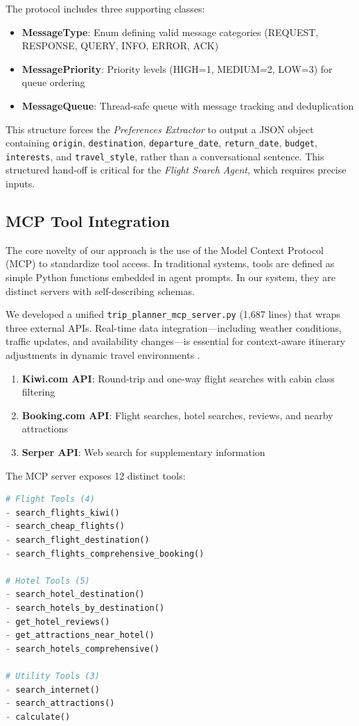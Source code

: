 \documentclass[10pt,twocolumn]{article}
\begin{document}
The protocol includes three supporting classes:
\begin{itemize}
    \item \textbf{MessageType}: Enum defining valid message categories (REQUEST, RESPONSE, QUERY, INFO, ERROR, ACK)
    \item \textbf{MessagePriority}: Priority levels (HIGH=1, MEDIUM=2, LOW=3) for queue ordering
    \item \textbf{MessageQueue}: Thread-safe queue with message tracking and deduplication
\end{itemize}

This structure forces the \textit{Preferences Extractor} to output a JSON object containing \texttt{origin}, \texttt{destination}, \texttt{departure\_date}, \texttt{return\_date}, \texttt{budget}, \texttt{interests}, and \texttt{travel\_style}, rather than a conversational sentence. This structured hand-off is critical for the \textit{Flight Search Agent}, which requires precise inputs.

\subsection{MCP Tool Integration}
The core novelty of our approach is the use of the Model Context Protocol (MCP) to standardize tool access. In traditional systems, tools are defined as simple Python functions embedded in agent prompts. In our system, they are distinct servers with self-describing schemas.

We developed a unified \texttt{trip\_planner\_mcp\_server.py} (1,687 lines) that wraps three external APIs. Real-time data integration---including weather conditions, traffic updates, and availability changes---is essential for context-aware itinerary adjustments in dynamic travel environments \cite{anitha2025intelligent, ravindra2025seamless}.

\begin{enumerate}
    \item \textbf{Kiwi.com API}: Round-trip and one-way flight searches with cabin class filtering
    \item \textbf{Booking.com API}: Flight searches, hotel searches, reviews, and nearby attractions
    \item \textbf{Serper API}: Web search for supplementary information
\end{enumerate}

The MCP server exposes 12 distinct tools:

\begin{lstlisting}[language=Python, caption=MCP Tool Categories]
# Flight Tools (4)
- search_flights_kiwi()
- search_cheap_flights()
- search_flight_destination()
- search_flights_comprehensive_booking()

# Hotel Tools (5)
- search_hotel_destination()
- search_hotels_by_destination()
- get_hotel_reviews()
- get_attractions_near_hotel()
- search_hotels_comprehensive()

# Utility Tools (3)
- search_internet()
- search_attractions()
- calculate()
\end{lstlisting}
\end{document}
